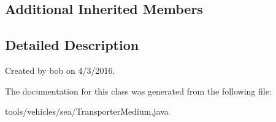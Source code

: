 \subsection*{Additional Inherited Members}


\subsection{Detailed Description}
Created by bob on 4/3/2016. 

The documentation for this class was generated from the following file\+:\begin{DoxyCompactItemize}
\item 
tools/vehicles/sea/Transporter\+Medium.\+java\end{DoxyCompactItemize}
